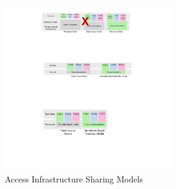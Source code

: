 \begin{figure}[htbp]
  \centering
  \includegraphics[width=0.65\textwidth]{Figures/ICBC-ownership.pdf}
\caption{Access Infrastructure Sharing Models}
\label{Fig_access}
\end{figure}


